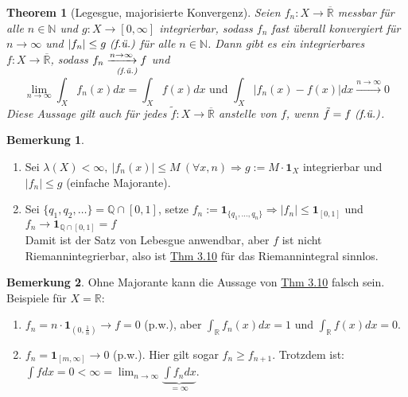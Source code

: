 \documentclass[a4paper]{scrreprt}
\newcommand{\doubleOne}{\textbf{1}}
\newcommand{\R}{\mathbb{R}}
\newcommand{\Rq}{\overline{\R}}
\newcommand{\N}{\mathbb{N}}
\newcommand{\Q}{\mathbb{Q}}
\newcommand{\toInf}{\rightarrow \infty}
\newcommand{\limToInf}[1]{\lim_{#1 \toInf}}
\newcommand{\jlabel}[1]{\label{j_#1}}
\newcommand{\jhyperref}[2]{\hyperref[j_#1]{#2}}
\newcommand{\jlink}[1]{\jhyperref{#1}{#1}}
\newcommand{\fu}{\text{\textit{(f.ü.)}}}
\newcommand{\jabb}[3]{ #1: #2 \rightarrow #3 }
\theoremstyle{plain}
\newtheorem{thm}{Theorem}[chapter]
\theoremstyle{definition}
\newtheorem{bem}[thm]{Bemerkung}
\newtheorem*{bem*}{Bemerkung}
\begin{document}
{{{{\begin{thm}[Legesgue, majorisierte Konvergenz]
\jlabel{Thm 3.10}
    Seien $\jabb{f_n}{X}{\Rq}$ messbar für alle $n\in\N$ und $\jabb{g}{X}{[0,\infty]}$ integrierbar, sodass $f_n$ fast überall konvergiert für $n\rightarrow \infty$ und $|f_n| \le g \ \fu$ für alle $n\in\N$. Dann gibt es ein integrierbares $\jabb{f}{X}{\Rq}$, sodass $f_n \underset{\fu}{\xrightarrow{n\rightarrow \infty} f}$ und
    \begin{displaymath}
        \limToInf{n} \int_X f_n(x)dx = \int_X f(x) dx \text{ und } \int_X |f_n(x)-f(x)|dx \xrightarrow{n\rightarrow \infty} 0
    \end{displaymath}
    Diese Aussage gilt auch für jedes $\jabb{\tilde{f}}{X}{\Rq}$ anstelle von $f$, wenn $\tilde{f} = f \ \fu$.
\end{thm}

\begin{bem*}
    \begin{enumerate}
        \item Sei $\lambda(X) < \infty, \ |f_n(x)| \le M \ (\forall x, n) \Rightarrow g:= M\cdot \doubleOne_X$ integrierbar und $|f_n| \le g$ (einfache Majorante).
        \item Sei $\{q_1, q_2,\dots\} = \Q \cap [0,1]$, setze $f_n := \doubleOne_{\{q_1, \dots, q_n\}} \Rightarrow |f_n| \le \doubleOne_{[0,1]}$ und $f_n \rightarrow \doubleOne_{\Q \cap [0,1]} = f$\\
        Damit ist der Satz von Lebesgue anwendbar, aber $f$ ist nicht Riemannintegrierbar, also ist \jlink{Thm 3.10} für das Riemannintegral sinnlos.
    \end{enumerate}

\end{bem*}


\begin{bem}
\jlabel{Bem 3.11}
    Ohne Majorante kann die Aussage von \jlink{Thm 3.10} falsch sein. Beispiele für $X = \R$:
    \begin{enumerate}
        \item 
            $f_n = n\cdot \doubleOne_{(0, \frac{1}{n})} \rightarrow f = 0$ (p.w.), aber $\int_\R f_n(x) dx = 1$ und $\int_\R f(x)dx = 0$.
            
        \item
            $f_n = \doubleOne_{[m, \infty]} \rightarrow 0$ (p.w.). Hier gilt sogar $f_n \ge f_{n+1}$. Trotzdem ist: \\
            $\int f dx = 0 < \infty = \limToInf{n} \underbrace{\int f_n dx}_{=\infty}$.
    \end{enumerate}


\end{bem}}}}}
\end{document}

